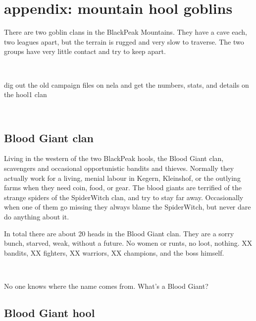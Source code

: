 \clearpage
\section*{appendix: mountain hool goblins}
\label{appendixmountaingoblins}

\raggedbottom

There are two goblin clans in the BlackPeak Mountains. They have a cave each, two leagues apart, but the terrain is rugged and very slow to traverse. The two groups have very little contact and try to keep apart.

\

\todo dig out the old campaign files on nela and get the numbers, stats, and details on the hool1 clan

\


\subsection*{Blood Giant clan}

Living in the western of the two BlackPeak hools, the Blood Giant clan, scavengers and occasional opportunistic bandits and thieves. Normally they actually work for a living, menial labour in Kegern, Kleinshof, or the outlying farms when they need coin, food, or gear. The blood giants are terrified of the strange spiders of the SpiderWitch clan, and try to stay far away. Occasionally when one of them go missing they always blame the SpiderWitch, but never dare do anything about it.

In total there are about 20 heads in the Blood Giant clan. They are a sorry bunch, starved, weak, without a future. No women or runts, no loot, nothing.
XX bandits, 
XX fighters, 
XX warriors, 
XX champions, 
and the boss himself.

\

\noindent No one knows where the name comes from. What's a Blood Giant?


\subsection*{Blood Giant hool}

